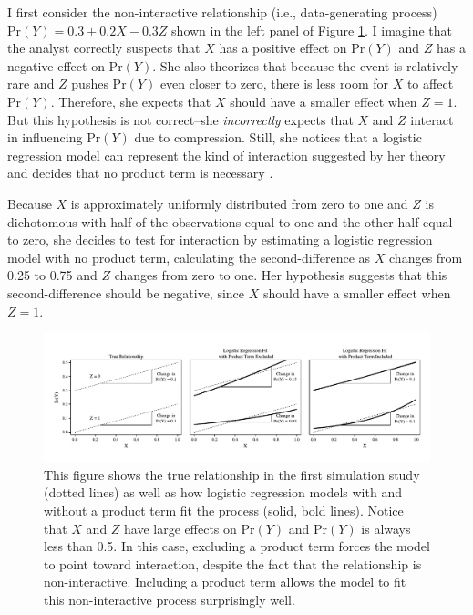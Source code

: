 \documentclass[12pt]{article}
\begin{document}
I first consider the non-interactive relationship (i.e., data-generating process) $\text{Pr}(Y) = 0.3 + 0.2X - 0.3Z$ shown in the left panel of Figure \ref{fig:relationships_fits}. I imagine that the analyst correctly suspects that $X$ has a positive effect on $\text{Pr}(Y)$ and $Z$ has a negative effect on $\text{Pr}(Y)$.  She also theorizes that because the event is relatively rare and $Z$ pushes $\text{Pr}(Y)$ even closer to zero,  there is less room for $X$ to affect $\text{Pr}(Y)$. Therefore, she expects that $X$ should have a smaller effect when $Z=1$. But this hypothesis is not correct--she \textit{incorrectly} expects that $X$ and $Z$ interact in influencing $\text{Pr}(Y)$ due to compression. Still, she notices that a logistic regression model can represent the kind of interaction suggested by her theory and decides that no product term is necessary \citep{BerryDeMerittEsarey2010}. 

Because $X$ is approximately uniformly distributed from zero to one and $Z$ is dichotomous with half of the observations equal to one and the other half equal to zero, she decides to test for interaction by estimating a logistic regression model with no product term, calculating the second-difference as $X$ changes from 0.25 to 0.75 and $Z$ changes from zero to one. Her hypothesis suggests that this second-difference should be negative, since $X$ should have a smaller effect when $Z=1$.

\begin{figure}[H]
\begin{center}
\includegraphics[width=\linewidth]{fig/fig_example.pdf}
\end{center}
\caption{This figure shows the true relationship in the first simulation study (dotted lines) as well as how logistic regression models with and without a product term fit the process (solid, bold lines). Notice that $X$ and $Z$ have large effects on $\text{Pr}(Y)$ and $\text{Pr}(Y)$ is always less than 0.5. In this case, excluding a product term forces the model to point toward interaction, despite the fact that the relationship is non-interactive. Including a product term allows the model to fit this non-interactive process surprisingly well.}\label{fig:relationships_fits}
\end{figure}
\end{document}
